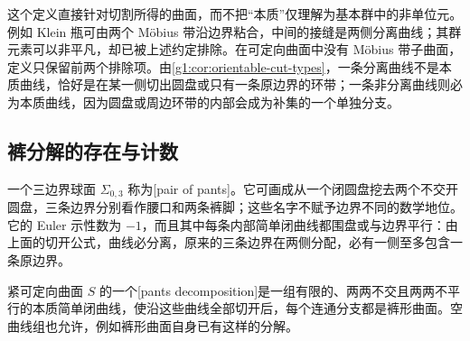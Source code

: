 这个定义直接针对切割所得的曲面，而不把“本质”仅理解为基本群中的非单位元。例如 Klein 瓶可由两个 Möbius 带沿边界粘合，中间的接缝是两侧分离曲线；其群元素可以非平凡，却已被上述约定排除。在可定向曲面中没有 Möbius 带子曲面，定义只保留前两个排除项。由\cref{g1:cor:orientable-cut-types}，一条分离曲线不是本质曲线，恰好是在某一侧切出圆盘或只有一条原边界的环带；一条非分离曲线则必为本质曲线，因为圆盘或周边环带的内部会成为补集的一个单独分支。

\subsection{裤分解的存在与计数}
\label{g1:subsec:0606:02}

一个三边界球面 \(\Sigma_{0,3}\) 称为[pair of pants]。它可画成从一个闭圆盘挖去两个不交开圆盘，三条边界分别看作腰口和两条裤脚；这些名字不赋予边界不同的数学地位。它的 Euler 示性数为 \(-1\)，而且其中每条内部简单闭曲线都围盘或与边界平行：由上面的切开公式，曲线必分离，原来的三条边界在两侧分配，必有一侧至多包含一条原边界。

\begin{definition}\label{g1:def:pants-decomposition}
	紧可定向曲面 \(S\) 的一个[pants decomposition]是一组有限的、两两不交且两两不平行的本质简单闭曲线，使沿这些曲线全部切开后，每个连通分支都是裤形曲面。空曲线组也允许，例如裤形曲面自身已有这样的分解。
\end{definition}


